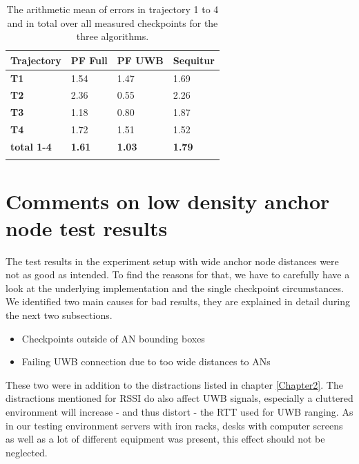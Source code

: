 \begin{table}
\caption{The arithmetic mean of errors in trajectory 1 to 4 and in total over all measured checkpoints for the three algorithms.}
\label{tab:arithmetic_errors}
\centering
\begin{tabular}{l l l l}
\toprule
\textbf{Trajectory} & \textbf{PF Full} & \textbf{PF UWB} & \textbf{Sequitur}\\
\midrule
\textbf{T1} & 1.54 & 1.47 & 1.69\\
\textbf{T2} & 2.36 & 0.55 & 2.26\\
\textbf{T3} & 1.18 & 0.80 & 1.87\\
\textbf{T4} & 1.72 & 1.51 & 1.52\\
\midrule
\textbf{total 1-4}  & \textbf{1.61} & \textbf{1.03} & \textbf{1.79}\\
\bottomrule\\
\end{tabular}
\end{table}


\section{Comments on low density anchor node test results}
\label{Section2}
The test results in the experiment setup with wide anchor node distances were not as good as intended. To find the reasons for that, we have to carefully have a look at the underlying implementation and the single checkpoint circumstances. We identified two main causes for bad results, they are explained in detail during the next two subsections.
\begin{itemize}
\item Checkpoints outside of AN bounding boxes
\item Failing UWB connection due to too wide distances to ANs
\end{itemize}
These two were in addition to the distractions listed in chapter \ref{Chapter2}. The distractions mentioned for RSSI do also affect UWB signals, especially a cluttered environment will increase - and thus distort - the RTT used for UWB ranging. As in our testing environment servers with iron racks, desks with computer screens as well as a lot of different equipment was present, this effect should not be neglected.

